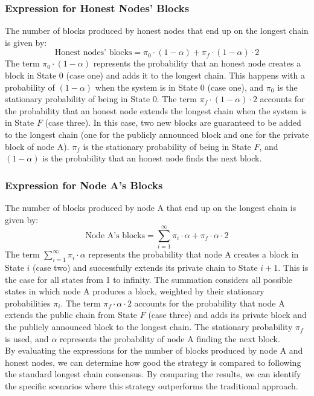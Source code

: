 \subsubsection{Expression for Honest Nodes' Blocks}
The number of blocks produced by honest nodes that end up on the longest chain is given by:
$$
\text{Honest nodes' blocks} = \pi_0 \cdot (1 - \alpha) + \pi_f \cdot (1 - \alpha) \cdot 2$$
The term $\pi_0 \cdot (1 - \alpha)$ represents the probability that an honest node creates a block in State 0 (case one) and adds it to the longest chain. This happens with a probability of $(1 - \alpha)$ when the system is in State 0 (case one), and $\pi_0$ is the stationary probability of being in State 0.
The term $\pi_f \cdot (1 - \alpha) \cdot 2$ accounts for the probability that an honest node extends the longest chain when the system is in State $F$ (case three). In this case, two new blocks are guaranteed to be added to the longest chain (one for the publicly announced block and one for the private block of node A). $\pi_f$ is the stationary probability of being in State $F$, and $(1 - \alpha)$ is the probability that an honest node finds the next block.

\subsubsection{Expression for Node A's Blocks}
The number of blocks produced by node A that end up on the longest chain is given by:
$$
\text{Node A's blocks} = \sum_{i=1}^{\infty} \pi_i \cdot \alpha + \pi_f \cdot \alpha \cdot 2
$$
The term $\sum_{i=1}^{\infty} \pi_i \cdot \alpha$ represents the probability that node A creates a block in State $i$ (case two) and successfully extends its private chain to State $i+1$. This is the case for all states from 1 to infinity. The summation considers all possible states in which node A produces a block, weighted by their stationary probabilities $\pi_i$.
The term $\pi_f \cdot \alpha \cdot 2$ accounts for the probability that node A extends the public chain from State $F$ (case three) and adds its private block and the publicly announced block to the longest chain. The stationary probability $\pi_f$ is used, and $\alpha$ represents the probability of node A finding the next block.\\

By evaluating the expressions for the number of blocks produced by node A and honest nodes, we can determine how good the strategy is compared to following the standard longest chain consensus. By comparing the results, we can identify the specific scenarios where this strategy outperforms the traditional approach.

